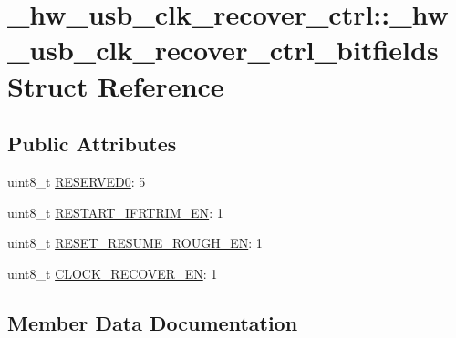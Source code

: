 \hypertarget{struct__hw__usb__clk__recover__ctrl_1_1__hw__usb__clk__recover__ctrl__bitfields}{}\section{\+\_\+hw\+\_\+usb\+\_\+clk\+\_\+recover\+\_\+ctrl\+:\+:\+\_\+hw\+\_\+usb\+\_\+clk\+\_\+recover\+\_\+ctrl\+\_\+bitfields Struct Reference}
\label{struct__hw__usb__clk__recover__ctrl_1_1__hw__usb__clk__recover__ctrl__bitfields}
\subsection*{Public Attributes}
\begin{DoxyCompactItemize}
\item 
uint8\+\_\+t \hyperlink{struct__hw__usb__clk__recover__ctrl_1_1__hw__usb__clk__recover__ctrl__bitfields_a3a868afc8d96ce97bf38f6c09b236b40}{R\+E\+S\+E\+R\+V\+E\+D0}\+: 5
\item 
uint8\+\_\+t \hyperlink{struct__hw__usb__clk__recover__ctrl_1_1__hw__usb__clk__recover__ctrl__bitfields_ac3d8de6d30770d76e1a62d304ef26ee5}{R\+E\+S\+T\+A\+R\+T\+\_\+\+I\+F\+R\+T\+R\+I\+M\+\_\+\+EN}\+: 1
\item 
uint8\+\_\+t \hyperlink{struct__hw__usb__clk__recover__ctrl_1_1__hw__usb__clk__recover__ctrl__bitfields_adc4bb268bff09d734f4a87eab6a5a4f9}{R\+E\+S\+E\+T\+\_\+\+R\+E\+S\+U\+M\+E\+\_\+\+R\+O\+U\+G\+H\+\_\+\+EN}\+: 1
\item 
uint8\+\_\+t \hyperlink{struct__hw__usb__clk__recover__ctrl_1_1__hw__usb__clk__recover__ctrl__bitfields_a601c6219c475b9d4f28186ac87064588}{C\+L\+O\+C\+K\+\_\+\+R\+E\+C\+O\+V\+E\+R\+\_\+\+EN}\+: 1
\end{DoxyCompactItemize}


\subsection{Member Data Documentation}
